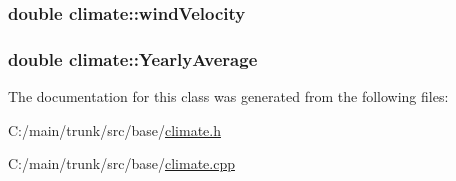 \label{classclimate_a2ea6785177ec472ee70009382089f396}
\hypertarget{classclimate_a0fdb19390d0caddd676c737e5f72eaea}{
\subsubsection[{windVelocity}]{\setlength{\rightskip}{0pt plus 5cm}double {\bf climate::windVelocity}}}
\label{classclimate_a0fdb19390d0caddd676c737e5f72eaea}
\hypertarget{classclimate_a6d40dd2d63e74f09b8faa398ce4a4123}{
\subsubsection[{YearlyAverage}]{\setlength{\rightskip}{0pt plus 5cm}double {\bf climate::YearlyAverage}}}
\label{classclimate_a6d40dd2d63e74f09b8faa398ce4a4123}


The documentation for this class was generated from the following files:\begin{DoxyCompactItemize}
\item 
C:/main/trunk/src/base/\hyperlink{climate_8h}{climate.h}\item 
C:/main/trunk/src/base/\hyperlink{climate_8cpp}{climate.cpp}\end{DoxyCompactItemize}
